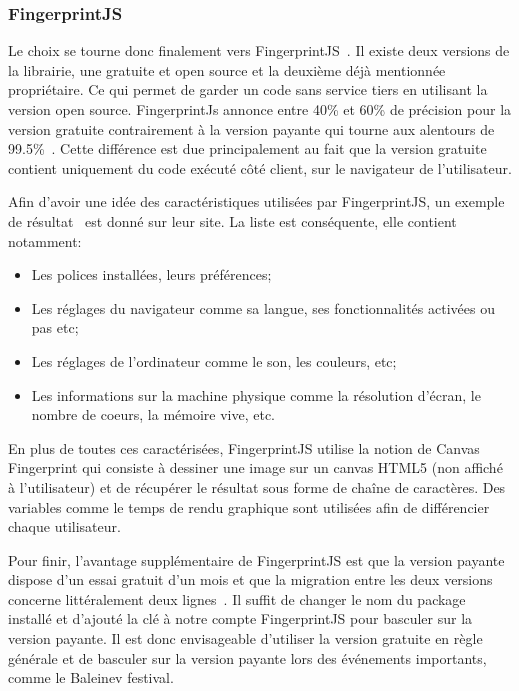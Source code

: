 
\subsubsection{FingerprintJS}
Le choix se tourne donc finalement vers FingerprintJS~\cite{fingerprintjs}. Il existe deux versions de la librairie, une gratuite et open source et la deuxième déjà mentionnée propriétaire. Ce qui permet de garder un code sans service tiers en utilisant la version open source. FingerprintJs annonce entre 40\% et 60\% de précision pour la version gratuite contrairement à la version payante qui tourne aux alentours de 99.5\%~\cite{fingerprintjsrepo}. Cette différence est due principalement au fait que la version gratuite contient uniquement du code exécuté côté client, sur le navigateur de l'utilisateur.

Afin d'avoir une idée des caractéristiques utilisées par FingerprintJS, un exemple de résultat~\cite{fingerprintjs-example} est donné sur leur site. La liste est conséquente, elle contient notamment:

\begin{itemize}
  \item Les polices installées, leurs préférences;
  \item Les réglages du navigateur comme sa langue, ses fonctionnalités activées ou pas etc;
  \item Les réglages de l'ordinateur comme le son, les couleurs, etc;
  \item Les informations sur la machine physique comme la résolution d'écran, le nombre de coeurs, la mémoire vive, etc.
\end{itemize}

En plus de toutes ces caractérisées, FingerprintJS utilise la notion de Canvas Fingerprint qui consiste à dessiner une image sur un canvas HTML5 (non affiché à l'utilisateur) et de récupérer le résultat sous forme de chaîne de caractères. Des variables comme le temps de rendu graphique sont utilisées afin de différencier chaque utilisateur.

Pour finir, l'avantage supplémentaire de FingerprintJS est que la version payante dispose d'un essai gratuit d'un mois et que la migration entre les deux versions concerne littéralement deux lignes~\cite{migratefingerprintjs}. Il suffit de changer le nom du package installé et d'ajouté la clé à notre compte FingerprintJS pour basculer sur la version payante. Il est donc envisageable d'utiliser la version gratuite en règle générale et de basculer sur la version payante lors des événements importants, comme le Baleinev festival.

